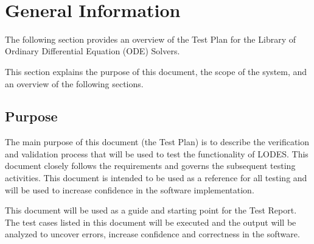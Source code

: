 \documentclass[12pt, titlepage]{article}
\newcommand{\famname}{LODES} %
\begin{document}
~\newpage

\tableofcontents

\listoftables


\newpage



\section{General Information}
The following section provides an overview of the Test Plan for the Library of Ordinary Differential Equation (ODE) 
Solvers.\\  
  
This section explains the purpose of this document, the scope of the system, and an overview of the following 
sections.


\subsection{Purpose}
The main purpose of this document (the Test Plan) is to describe the verification and validation process that will 
be used to test the functionality of \famname{}.  This document closely follows the requirements and governs
the subsequent testing activities. This document is intended to be used as a reference for all testing and will be
used to increase confidence in the 
software implementation.  

This document will be used as a guide and starting point for the Test Report. The test cases
listed in this document will be executed and the output will be analyzed to uncover errors, increase confidence 
and correctness in the software.
\end{document}
